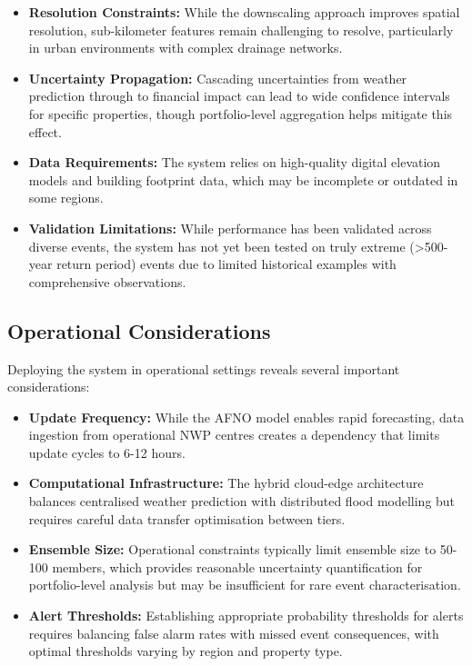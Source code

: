 \documentclass{article}
\begin{document}
\begin{itemize}
    \item \textbf{Resolution Constraints:} While the downscaling approach improves spatial resolution, sub-kilometer features remain challenging to resolve, particularly in urban environments with complex drainage networks.
    
    \item \textbf{Uncertainty Propagation:} Cascading uncertainties from weather prediction through to financial impact can lead to wide confidence intervals for specific properties, though portfolio-level aggregation helps mitigate this effect.
    
    \item \textbf{Data Requirements:} The system relies on high-quality digital elevation models and building footprint data, which may be incomplete or outdated in some regions.
    
    \item \textbf{Validation Limitations:} While performance has been validated across diverse events, the system has not yet been tested on truly extreme (>500-year return period) events due to limited historical examples with comprehensive observations.
\end{itemize}

\subsection{Operational Considerations}

Deploying the system in operational settings reveals several important considerations:

\begin{itemize}
    \item \textbf{Update Frequency:} While the AFNO model enables rapid forecasting, data ingestion from operational NWP centres creates a dependency that limits update cycles to 6-12 hours.
    
    \item \textbf{Computational Infrastructure:} The hybrid cloud-edge architecture balances centralised weather prediction with distributed flood modelling but requires careful data transfer optimisation between tiers.
    
    \item \textbf{Ensemble Size:} Operational constraints typically limit ensemble size to 50-100 members, which provides reasonable uncertainty quantification for portfolio-level analysis but may be insufficient for rare event characterisation.
    
    \item \textbf{Alert Thresholds:} Establishing appropriate probability thresholds for alerts requires balancing false alarm rates with missed event consequences, with optimal thresholds varying by region and property type.
\end{itemize}
\end{document}
